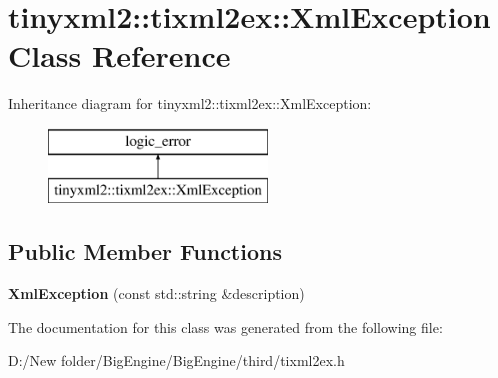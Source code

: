 \hypertarget{classtinyxml2_1_1tixml2ex_1_1_xml_exception}{}\section{tinyxml2\+:\+:tixml2ex\+:\+:Xml\+Exception Class Reference}
\label{classtinyxml2_1_1tixml2ex_1_1_xml_exception}
Inheritance diagram for tinyxml2\+:\+:tixml2ex\+:\+:Xml\+Exception\+:\begin{figure}[H]
\begin{center}
\leavevmode
\includegraphics[height=2.000000cm]{classtinyxml2_1_1tixml2ex_1_1_xml_exception}
\end{center}
\end{figure}
\subsection*{Public Member Functions}
\begin{DoxyCompactItemize}
\item 
\mbox{\label{classtinyxml2_1_1tixml2ex_1_1_xml_exception_affc968d53688e2a0d2490bb97feffb4d}} 
{\bfseries Xml\+Exception} (const std\+::string \&description)
\end{DoxyCompactItemize}


The documentation for this class was generated from the following file\+:\begin{DoxyCompactItemize}
\item 
D\+:/\+New folder/\+Big\+Engine/\+Big\+Engine/third/tixml2ex.\+h\end{DoxyCompactItemize}
